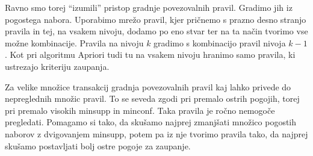 Ravno smo torej ``izumili'' pristop gradnje povezovalnih pravil. Gradimo jih iz pogostega nabora. Uporabimo mrežo pravil, kjer pričnemo s prazno desno stranjo pravila in tej, na vsakem nivoju, dodamo po eno stvar ter na ta način tvorimo vse možne kombinacije. Pravila na nivoju $k$ gradimo s kombinacijo pravil nivoja $k-1$. Kot pri algoritmu Apriori tudi tu na vsakem nivoju hranimo samo pravila, ki ustrezajo kriteriju zaupanja.

Za velike množice transakcij gradnja povezovalnih pravil kaj lahko privede do nepreglednih množic pravil. To se seveda zgodi pri premalo ostrih pogojih, torej pri premalo visokih minsupp in minconf. Taka pravila je ročno nemogoče pregledati. Pomagamo si tako, da skušamo najprej zmanjšati množico pogostih naborov z dvigovanjem minsupp, potem pa iz nje tvorimo pravila tako, da najprej skušamo postavljati bolj ostre pogoje za zaupanje. 
